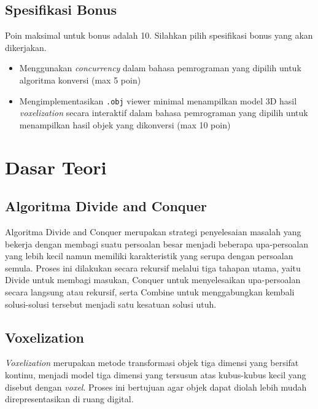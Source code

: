 
\subsection{Spesifikasi Bonus}\label{sub:Spesifikasi Bonus} %
Poin maksimal untuk bonus adalah 10. Silahkan pilih spesifikasi bonus
yang akan dikerjakan.
\begin{itemize}[leftmargin=*]
    \item Menggunakan \textit{concurrency} dalam bahasa pemrograman
        yang dipilih untuk algoritma konversi (max 5 poin)
    \item Mengimplementasikan \texttt{.obj} viewer minimal
        menampilkan model 3D hasil \textit{voxelization} secara
        interaktif dalam bahasa pemrograman yang dipilih untuk
        menampilkan hasil objek yang dikonversi (max 10 poin)
\end{itemize}


\section{Dasar Teori}\label{sec:Dasar Teori} %
\subsection{Algoritma Divide and Conquer}
Algoritma Divide and Conquer merupakan strategi penyelesaian masalah
yang bekerja dengan membagi suatu persoalan besar menjadi beberapa
upa-persoalan yang lebih kecil namun memiliki karakteristik yang
serupa dengan persoalan semula. Proses ini dilakukan secara rekursif
melalui tiga tahapan utama, yaitu Divide untuk membagi masukan,
Conquer untuk menyelesaikan upa-persoalan secara langsung atau
rekursif, serta Combine untuk menggabungkan kembali solusi-solusi
tersebut menjadi satu kesatuan solusi utuh.

\subsection{Voxelization}\label{sub:Voxelization} %
\textit{Voxelization} merupakan metode transformasi objek tiga
dimensi yang bersifat kontinu, menjadi model tiga dimensi yang
tersusun atas kubus-kubus kecil yang disebut dengan \textit{voxel}.
Proses ini bertujuan agar objek dapat diolah lebih mudah
direpresentasikan di ruang digital.


